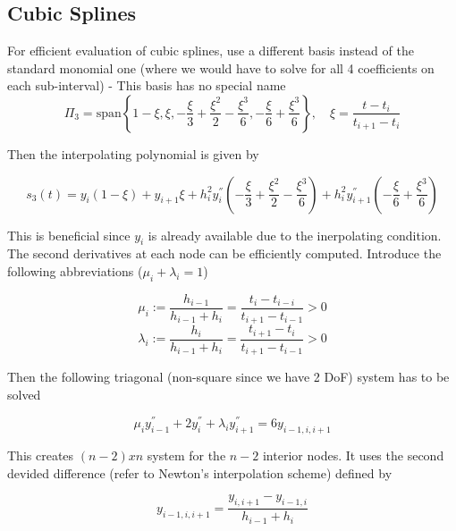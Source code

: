 \documentclass[
    a4paper,
    11pt
]{article}
\begin{document}
\subsection{Cubic Splines}

For efficient evaluation of cubic splines, use a different basis instead of the
standard monomial one (where we would have to solve for all 4 coefficients on
each sub-interval) - This basis has no special name
\begin{equation}
    \Pi_3 = \text{span}\left\{
        1 - \xi,
        \xi,
        -\frac{\xi}{3}+\frac{\xi^2}{2}-\frac{\xi^3}{6},
        -\frac{\xi}{6} + \frac{\xi^3}{6}
    \right\}, \quad \xi = \frac{t-t_i}{t_{i+1} - t_i}
\end{equation}

Then the interpolating polynomial is given by

\begin{equation}
    s_3(t) = y_i(1-\xi) + y_{i+1}\xi + h_i^2 y_i^{''} \left( -\frac{\xi}{3} +
    \frac{\xi^2}{2} - \frac{\xi^3}{6} \right) + h_i^2 y_{i+1}^{''} \left(
    -\frac{\xi}{6} + \frac{\xi^3}{6} \right)
\end{equation}

This is beneficial since $y_i$ is already available due to the inerpolating
condition. The second derivatives at each node can be efficiently computed.
Introduce the following abbreviations ($\mu_i + \lambda_i =1$)

\begin{equation}
    \mu_i := \frac{h_{i-1}}{h_{i-1} + h_i} = \frac{t_i -t_{i-i}}{t_{i+1} -
    t_{i-1}} > 0
\end{equation}
\begin{equation}
    \lambda_i := \frac{h_i}{h_{i-1} + h_i} = \frac{t_{i+1} - t_i}{t_{i+1} -
    t_{i-1}} > 0
\end{equation}

Then the following triagonal (non-square since we have 2 DoF) system has to be
solved

\begin{equation}
    \mu_i y_{i-1}^{''} + 2y_i^{''} + \lambda_i y_{i+1}^{''} = 6 y_{i-1,i,i+1}
\end{equation}

This creates $(n-2) x n$ system for the $n-2$ interior nodes. It uses the second
devided difference (refer to Newton's interpolation scheme) defined by

\begin{equation}
    y_{i-1,i,i+1} = \frac{y_{i,i+1} - y_{i-1,i}}{h_{i-1} + h_i}
\end{equation}
\end{document}
